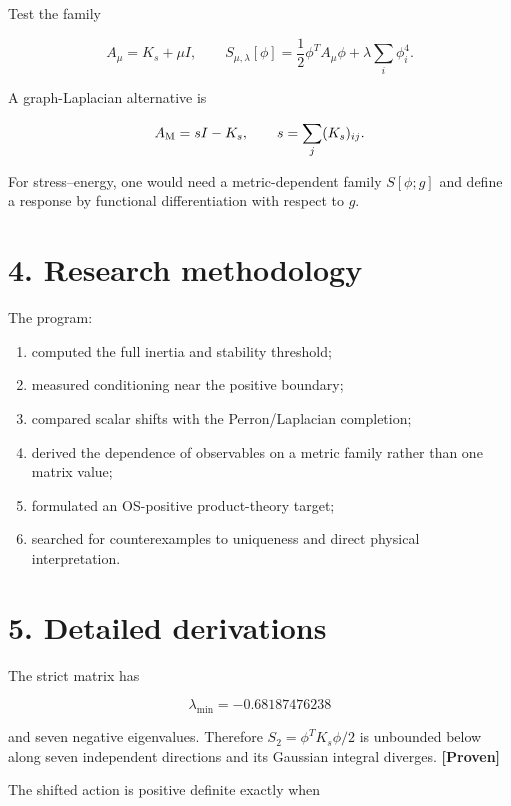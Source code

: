 \documentclass[11pt,a4paper,openany]{report}
\newcommand{\statusProven}{\textcolor{fingreen}{[Proven]}}
\begin{document}
Test the family

\[
A_\mu=K_s+\mu I,
\qquad
S_{\mu,\lambda}[\phi]
=\frac12\phi^TA_\mu\phi
+\lambda\sum_i\phi_i^4.
\]

A graph-Laplacian alternative is

\[
A_{\rm M}=sI-K_s,
\qquad s=\sum_j(K_s)_{ij}.
\]

For stress–energy, one would need a metric-dependent family \(S[\phi;g]\) and define a response by functional differentiation with respect to \(g\).

\section{4. Research methodology}

The program:

\begin{enumerate}
\item 
computed the full inertia and stability threshold;

\item 
measured conditioning near the positive boundary;

\item 
compared scalar shifts with the Perron/\allowbreak{}Laplacian completion;

\item 
derived the dependence of observables on a metric family rather than one matrix value;

\item 
formulated an OS-positive product-theory target;

\item 
searched for counterexamples to uniqueness and direct physical interpretation.

\end{enumerate}

\section{5. Detailed derivations}

The strict matrix has

\[
\lambda_{\min}=-0.68187476238
\]

and seven negative eigenvalues. Therefore \(S_2=\phi^TK_s\phi/2\) is unbounded below along seven independent directions and its Gaussian integral diverges. \textbf{\statusProven{}}

The shifted action is positive definite exactly when
\end{document}
